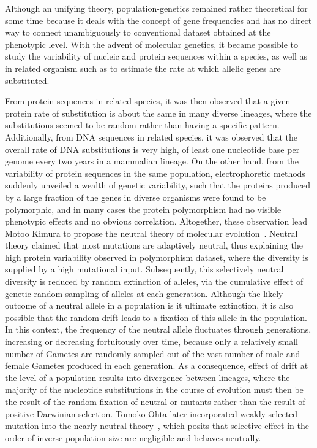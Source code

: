 Although an unifying theory, population-genetics remained rather theoretical for some time because it deals with the concept of gene frequencies and has no direct way to connect unambiguously to conventional dataset obtained at the phenotypic level.
With the advent of molecular genetics, it became possible to study the variability of nucleic and protein sequences within a species, as well as in related organism such as to estimate the rate at which allelic genes are substituted.

From protein sequences in related species, it was then observed that a given protein rate of \gls{substitution} is about the same in many diverse lineages, where the \glspl{substitution} seemed to be random rather than having a specific pattern.
Additionally, from \acrshort{DNA} sequences in related species, it was observed that the overall rate of \acrshort{DNA} \glspl{substitution} is very high, of least one nucleotide base per genome every two years in a mammalian lineage.
On the other hand, from the variability of protein sequences in the same population, electrophoretic methods suddenly unveiled a wealth of genetic variability, such that the proteins produced by a large fraction of the genes in diverse organisms were found to be \gls{polymorphic}, and in many cases the protein polymorphism had no visible phenotypic effects and no obvious correlation.
Altogether, these observation lead Motoo Kimura to propose the \gls{neutral} theory of molecular evolution~\citep{kimura1968evolutionary,kimura1991neutral,kimura1986dna}.
Neutral theory claimed that most mutations are adaptively \gls{neutral}, thus explaining the high protein variability observed in polymorphism dataset, where the diversity is supplied by a high mutational input.
Subsequently, this selectively \gls{neutral} diversity is reduced by random extinction of \glspl{allele}, via the cumulative effect of genetic random sampling of \glspl{allele} at each generation.
Although the likely outcome of a \gls{neutral} \gls{allele} in a population is it ultimate extinction, it is also possible that the random drift leads to a fixation of this \gls{allele} in the population.
In this context, the frequency of the \gls{neutral} \gls{allele} fluctuates through generations, increasing or decreasing fortuitously over time, because only a relatively small number of \glspl{Gamete} are randomly sampled out of the vast number of male and female \glspl{Gamete} produced in each generation.
As a consequence, effect of \gls{drift} at the level of a population results into divergence between lineages, where the majority of the nucleotide \glspl{substitution} in the course of evolution must then be the result of the random fixation of \gls{neutral} or mutants rather than the result of positive Darwinian selection.
Tomoko Ohta later incorporated weakly selected mutation into the \gls{nearly-neutral} theory~\citep{ohta1973slightly}, which posits that selective effect in the order of inverse population size are negligible and behaves neutrally.

